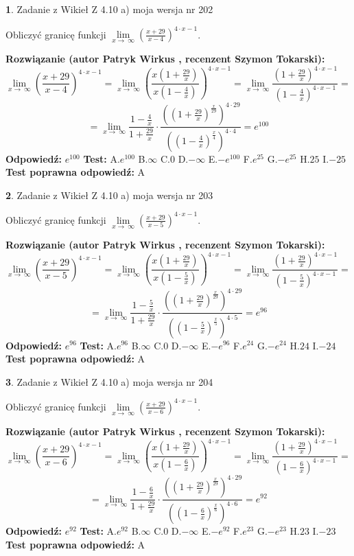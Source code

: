 \documentclass[12pt, a4paper]{article}
\theoremstyle{definition} %
\newtheorem{zad}{}
\newcommand{\zadStart}[1]{\begin{zad}#1\newline}
\newcommand{\zadStop}{\end{zad}}
\newcommand{\rozwStart}[2]{\noindent \textbf{Rozwiązanie (autor #1 , recenzent #2): }\newline}
\newcommand{\rozwStop}{\newline}
\newcommand{\odpStart}{\noindent \textbf{Odpowiedź:}\newline}
\newcommand{\odpStop}{\newline}
\newcommand{\testStart}{\noindent \textbf{Test:}\newline}
\newcommand{\testStop}{\newline}
\newcommand{\kluczStart}{\noindent \textbf{Test poprawna odpowiedź:}\newline}
\newcommand{\kluczStop}{\newline}
\begin{document}
\zadStart{Zadanie z Wikieł Z 4.10 a) moja wersja nr 202}

Obliczyć granicę funkcji  $\lim\limits_{x\to\ \infty}(\frac{x+29}{x-4})^{4\cdot x-1}$.
\zadStop
\rozwStart{Patryk Wirkus}{Szymon Tokarski}
$$\lim\limits_{x\to\ \infty}(\frac{x+29}{x-4})^{4\cdot x-1} = \lim\limits_{x\to\ \infty}(\frac{x(1+\frac{29}{x})}{x(1-\frac{4}{x})})^{4\cdot x-1}=\lim\limits_{x\to\ \infty}\frac{(1+\frac{29}{x})^{4\cdot x-1}}{(1-\frac{4}{x})^{4\cdot x-1}}=$$
$$=\lim\limits_{x\to\ \infty}\frac{1-\frac{4}{x}}{1+\frac{29}{x}}\cdot\frac{((1+\frac{29}{x})^{\frac{x}{29}})^{4\cdot29}}{((1-\frac{4}{x})^{\frac{x}{4}})^{4\cdot4}}=e^{100}$$
\rozwStop
\odpStart
$e^{100}$
\odpStop
\testStart
A.$e^{100}$ B.$\infty$ C.$0$ D.$-\infty$ E.$-e^{100}$
F.$e^{25}$ G.$-e^{25}$
H.$25$
I.$-25$
\testStop
\kluczStart
A
\kluczStop



\zadStart{Zadanie z Wikieł Z 4.10 a) moja wersja nr 203}

Obliczyć granicę funkcji  $\lim\limits_{x\to\ \infty}(\frac{x+29}{x-5})^{4\cdot x-1}$.
\zadStop
\rozwStart{Patryk Wirkus}{Szymon Tokarski}
$$\lim\limits_{x\to\ \infty}(\frac{x+29}{x-5})^{4\cdot x-1} = \lim\limits_{x\to\ \infty}(\frac{x(1+\frac{29}{x})}{x(1-\frac{5}{x})})^{4\cdot x-1}=\lim\limits_{x\to\ \infty}\frac{(1+\frac{29}{x})^{4\cdot x-1}}{(1-\frac{5}{x})^{4\cdot x-1}}=$$
$$=\lim\limits_{x\to\ \infty}\frac{1-\frac{5}{x}}{1+\frac{29}{x}}\cdot\frac{((1+\frac{29}{x})^{\frac{x}{29}})^{4\cdot29}}{((1-\frac{5}{x})^{\frac{x}{5}})^{4\cdot5}}=e^{96}$$
\rozwStop
\odpStart
$e^{96}$
\odpStop
\testStart
A.$e^{96}$ B.$\infty$ C.$0$ D.$-\infty$ E.$-e^{96}$
F.$e^{24}$ G.$-e^{24}$
H.$24$
I.$-24$
\testStop
\kluczStart
A
\kluczStop



\zadStart{Zadanie z Wikieł Z 4.10 a) moja wersja nr 204}

Obliczyć granicę funkcji  $\lim\limits_{x\to\ \infty}(\frac{x+29}{x-6})^{4\cdot x-1}$.
\zadStop
\rozwStart{Patryk Wirkus}{Szymon Tokarski}
$$\lim\limits_{x\to\ \infty}(\frac{x+29}{x-6})^{4\cdot x-1} = \lim\limits_{x\to\ \infty}(\frac{x(1+\frac{29}{x})}{x(1-\frac{6}{x})})^{4\cdot x-1}=\lim\limits_{x\to\ \infty}\frac{(1+\frac{29}{x})^{4\cdot x-1}}{(1-\frac{6}{x})^{4\cdot x-1}}=$$
$$=\lim\limits_{x\to\ \infty}\frac{1-\frac{6}{x}}{1+\frac{29}{x}}\cdot\frac{((1+\frac{29}{x})^{\frac{x}{29}})^{4\cdot29}}{((1-\frac{6}{x})^{\frac{x}{6}})^{4\cdot6}}=e^{92}$$
\rozwStop
\odpStart
$e^{92}$
\odpStop
\testStart
A.$e^{92}$ B.$\infty$ C.$0$ D.$-\infty$ E.$-e^{92}$
F.$e^{23}$ G.$-e^{23}$
H.$23$
I.$-23$
\testStop
\kluczStart
A
\kluczStop
\end{document}
